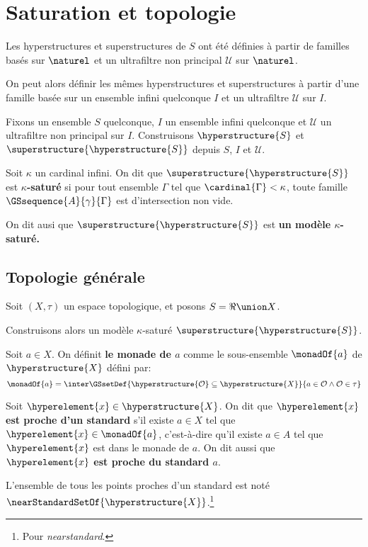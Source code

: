 \chapter{Saturation et topologie}

Les hyperstructures et superstructures de $S$ ont été définies à partir de
familles basés sur $\naturel$ et un ultrafiltre non principal $\mathcal{U}$ sur
$\naturel$.

On peut alors définir les mêmes hyperstructures et superstructures à partir
d'une famille basée sur un ensemble infini quelconque $I$ et un ultrafiltre
$\mathcal{U}$ sur $I$.

Fixons un ensemble $S$ quelconque, $I$ un ensemble infini quelconque et
$\mathcal{U}$ un ultrafiltre non principal sur $I$. Construisons
$\hyperstructure{S}$ et $\superstructure{\hyperstructure{S}}$ depuis $S$, $I$ et
$\mathcal{U}$.

\begin{definition}
	Soit $\kappa$ un cardinal infini.
	On dit que $\superstructure{\hyperstructure{S}}$ est \textbf{$\kappa$-saturé} si pour tout
	ensemble $\Gamma$ tel que $\cardinal{\Gamma} < \kappa$, toute famille
	$\GSsequence{A}{\gamma}{\Gamma}$ est d'intersection non vide.

	On dit ausi que $\superstructure{\hyperstructure{S}}$ est \textbf{un modèle
	$\kappa$-saturé.}
\end{definition}

\section{Topologie générale}

Soit $(X, \tau)$ un espace topologique, et posons $S = \real \union X$.

Construisons alors un modèle $\kappa$-saturé $\superstructure{\hyperstructure{S}}$.

\begin{definition}
	Soit $a \in X$. On définit \textbf{le monade de $a$} comme le sous-ensemble
	$\monadOf{a}$ de $\hyperstructure{X}$ défini par:
	\begin{equation}
		\monadOf{a} = \inter \GSsetDef{\hyperstructure{\mathcal{O}} \subseteq
		\hyperstructure{X}}{a \in \mathcal{O} \wedge \mathcal{O} \in \tau}
	\end{equation}
\end{definition}

\begin{definition}
	Soit $\hyperelement{x} \in \hyperstructure{X}$. On dit que
	\textbf{$\hyperelement{x}$ est proche d'un
	standard} s'il existe $a \in X$ tel que $\hyperelement{x} \in \monadOf{a}$,
	c'est-à-dire qu'il existe $a \in A$ tel que $\hyperelement{x}$ est dans le
	monade de $a$. On dit aussi que \textbf{$\hyperelement{x}$ est proche du
	standard $a$}.

	L'ensemble de tous les points proches d'un standard est noté
	$\nearStandardSetOf{\hyperstructure{X}}$.\footnote{Pour
		\textit{nearstandard}.}
\end{definition}


